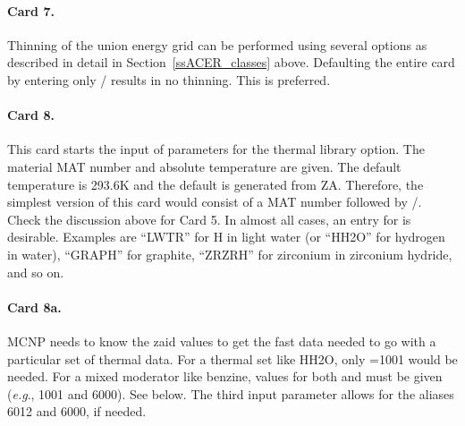 \paragraph{Card 7.}
Thinning of the union energy grid can be performed using several options
as described in detail in Section~\ref{ssACER_classes} above.  Defaulting
the entire card
by entering only / results in no thinning.  This is preferred.

\paragraph{Card 8.}
This card starts the input of parameters for the thermal library option.
The material MAT number and absolute temperature are given. The default
temperature is 293.6K and the default  is generated from ZA.
Therefore, the simplest version of this card would consist of a MAT
number followed by /.  Check the discussion above for Card 5.  In almost
all cases, an entry for  is desirable.  Examples are
``LWTR'' for H in light water (or ``HH2O'' for hydrogen in water),
``GRAPH'' for graphite, ``ZRZRH'' for zirconium in zirconium hydride,
and so on.

\paragraph{Card 8a.}
MCNP needs to know the zaid values to get the fast data needed to go
with a particular set of thermal data.  For a thermal set like HH2O,
only =1001 would be needed.  For a mixed moderator like
benzine, values for both  and  must
be given ({\it e.g}., 1001 and 6000).  See  below.    The
third input parameter allows for the aliases 6012 and 6000, if
needed.

